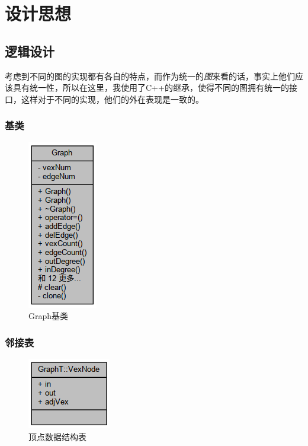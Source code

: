 \section{设计思想}
\subsection{逻辑设计}
考虑到不同的图的实现都有各自的特点，而作为统一的\emph{图}来看的话，事实上他们应该具有统一性，所以在这里，我使用了C++的继承，使得不同的图拥有统一的接口，这样对于不同的实现，他们的外在表现是一致的。

\subsubsection{基类}

\begin{figure}[H]
    \centering
    \includegraphics[width=0.1\linewidth]{figures/class_graph__coll__graph}
    \caption{Graph基类}
    \label{fig:classgraphcollgraph}
\end{figure}

\subsubsection{邻接表}

\begin{figure}
    \centering
    \includegraphics[width=0.5\linewidth]{figures/struct_graph_t_1_1_vex_node__coll__graph}
    \caption{顶点数据结构表}
    \label{fig:structgrapht11vexnodecollgraph}
\end{figure}

